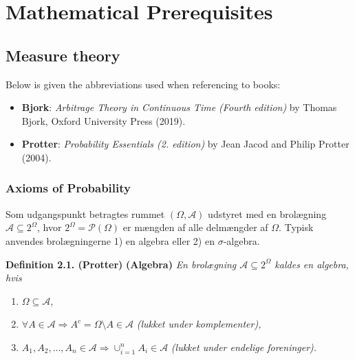 \documentclass[a4paper,10pt,openany]{book}
\providecommand{\tightlist}{%
 \setlength{\itemsep}{0pt}\setlength{\parskip}{0pt}}
\begin{document}
\hypertarget{part-mathematical-prerequisites}{%
\part{Mathematical Prerequisites}\label{part-mathematical-prerequisites}}

\hypertarget{appendix-appendix}{%
\appendix}


\hypertarget{measure-theory}{%
\chapter{Measure theory}\label{measure-theory}}

Below is given the abbreviations used when referencing to books:

\begin{itemize}
\tightlist
\item
  \textbf{Bjork}: \emph{Arbitrage Theory in Continuous Time (Fourth edition)} by Thomas Bjork, Oxford University Press (2019).\cite{bjork2009}
\item
  \textbf{Protter}: \emph{Probability Essentials (2. edition)} by Jean Jacod and Philip Protter (2004).\cite{jacod2004}
\end{itemize}

\hypertarget{axioms-of-probability}{%
\section{Axioms of Probability}\label{axioms-of-probability}}

Som udgangspunkt betragtes rummet \((\Omega,\mathcal{A})\) udstyret med en brolægning \(\mathcal{A}\subseteq 2^\Omega\), hvor \(2^\Omega=\mathcal{P}(\Omega)\) er mængden af alle delmængder af \(\Omega\). Typisk anvendes brolægningerne 1) en algebra eller 2) en \(\sigma\)-algebra.

\textbf{Definition 2.1. (Protter)} \textbf{(Algebra)} \emph{En brolægning \(\mathcal{A}\subseteq 2^\Omega\) kaldes en algebra, hvis}

\begin{enumerate}
\def\labelenumi{\arabic{enumi}.}
\tightlist
\item
  \(\Omega\subseteq\mathcal{A}\),
\item
  \(\forall A\in\mathcal{A} \Rightarrow A^c=\Omega\setminus A\in\mathcal{A}\) \emph{(lukket under komplementer),}
\item
  \(A_1,A_2,...,A_n\in\mathcal{A}\Rightarrow \cup_{i=1}^n A_i\in\mathcal{A}\) \emph{(lukket under endelige foreninger).}
\end{enumerate}
\end{document}
